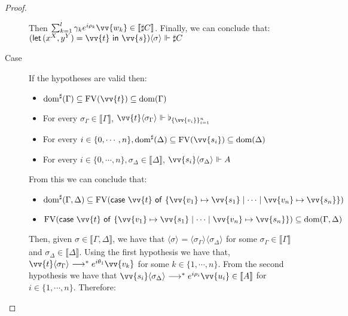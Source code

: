 \documentclass[runningheads,orivec,envcountsame,envcountsect]{llncs}
\newcommand\lra{\longrightarrow}
\newcommand\ansubst[2]{\ensuremath{\langle #1 \rangle_{#2}}}
\newcommand\dom[1]{\mathrm{dom}(#1)}
\newcommand\sdom[1]{\mathrm{dom}^{\sharp}(#1)}
\newcommand\FV[1]{\mathrm{FV}(#1)}
\def\Pair#1#2{(#1,#2)} %
\def\letkeyword{\mathsf{let}}
\def\inkeyword{\mathsf{in}}
\def\LetP#1#2#3#4#5#6{\letkeyword\,\Pair{#1^{#2}}{#3^{#4}}=#5~\inkeyword~#6}
\def\gencase#1#2#3#4#5{\ensuremath{\mathsf{case}~#1~\mathsf{of}~\{#2\mapsto #4 \mid \dotsb \mid #3\mapsto #5\}}}
\def\eval{\lra^*}
\def\sem#1{\llbracket#1\rrbracket}
\def\real{\Vdash}
\newcommand\basis[1]{\ensuremath{\flat_{#1}}}
\newcommand\genbasis[3]{\ensuremath{\basis{\{#1\}_{#2}^{#3}}}}
\begin{document}
\begin{proof}
\begin{description}
    Then $\sum_{k=1}^{l}\gamma_k e^{i\rho_k} \vv{w_k}\in\sem{\sharp C}$. Finally, we can conclude that: $(\LetP{x}{X}{y}{Y}{\vv{t}}{\vv{s}})\ansubst{\sigma}{}\real{\sharp C}$

    \item[Case] If the hypotheses are valid then:
    \begin{itemize}
        \item $\sdom{\Gamma}\subseteq \FV{\vv{t}}\subseteq \dom{\Gamma}$
        \item For every $\sigma_\Gamma\in\sem{\Gamma}$, $\vv{t}\ansubst{\sigma_\Gamma}{}\real\genbasis{\vv{v_i}}{i=1}{n}$
        \item For every $i\in\{0,\dotsb ,n\}, \sdom{\Delta}\subseteq \FV{\vv{s_i}}\subseteq \dom{\Delta}$
        \item For every $i\in\{0,\dotsb ,n\}, \sigma_\Delta\in\sem{\Delta}$, $\vv{s_i}\ansubst{\sigma_\Delta}{}\real A$
    \end{itemize}

    From this we can conclude that:

    \begin{itemize}
        \item $\sdom{\Gamma,\Delta}\subseteq \FV{\gencase{\vv{t}}{\vv{v_1}}{\vv {v_n}}{\vv{s_1}}{\vv{s_n}}}$
        \item $\FV{\gencase{\vv{t}}{\vv{v_1}}{\vv {v_n}}{\vv{s_1}}{\vv{s_n}}}\subseteq \dom{\Gamma,\Delta}$
    \end{itemize}
    
    Then, given $\sigma\in\sem{\Gamma,\Delta}$, we have that $\ansubst{\sigma}{}=\ansubst{\sigma_\Gamma}{}\ansubst{\sigma_\Delta}{}$ for some $\sigma_\Gamma\in\sem{\Gamma}$ and $\sigma_\Delta\in\sem{\Delta}$. Using the first hypothesis we have that, $\vv{t}\ansubst{\sigma_\Gamma}{}\eval e^{i\theta_1}\vv{v_k}$ for some $k\in\{1,\dotsb ,n\}$. From the second hypothesis we have that $\vv{s_i}\ansubst{\sigma_\Delta}{}\eval e^{i\rho_i}\vv{u_i}\in\sem{A}$ for $i\in\{1,\dotsb , n\}$. Therefore:


\end{description}
\end{proof}
\end{document}
